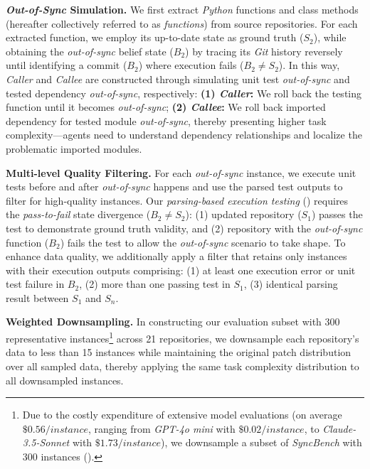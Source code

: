 \textbf{\textit{Out-of-Sync} Simulation.}
We first extract \textit{Python} functions and class methods (hereafter collectively referred to as \textit{functions}) from source repositories.
For each extracted function, we employ its up-to-date state as ground truth ($S_2$), while obtaining the \textit{out-of-sync} belief state ($B_2$) by tracing its \textit{Git} history reversely until identifying a commit ($B_2$) where execution fails ($B_2 \neq S_2$).
% 
In this way, \textit{Caller} and \textit{Callee} are constructed through simulating unit test \textit{out-of-sync} and tested dependency \textit{out-of-sync}, respectively:
\textbf{(1) \textit{Caller}:} We roll back the testing function until it becomes \textit{out-of-sync};
\textbf{(2) \textit{Callee}:} We roll back imported dependency for tested module \textit{out-of-sync}, thereby presenting higher task complexity---agents need to understand dependency relationships and localize the problematic imported modules.

\textbf{Multi-level Quality Filtering.}
For each \textit{out-of-sync} instance, we execute unit tests before and after \textit{out-of-sync} happens and use the parsed test outputs to filter for high-quality instances.
% 
Our \textit{parsing-based execution testing} () requires the \textit{pass-to-fail} state divergence ($B_2 \neq S_2$):
(1) updated repository ($S_1$) passes the test to demonstrate ground truth validity, and (2) repository with the \textit{out-of-sync} function ($B_2$) fails the test to allow the \textit{out-of-sync} scenario to take shape.
To enhance data quality, we additionally apply a filter that retains only instances with their execution outputs comprising: (1) at least one execution error or unit test failure in $B_2$, (2) more than one passing test in $S_1$, (3) identical parsing result between $S_1$ and $S_n$.

\textbf{Weighted Downsampling.}
In constructing our evaluation subset with 300 representative instances\footnote{
\label{Footnote: Cost Constraints}
Due to the costly expenditure of extensive model evaluations (on average $\$0.56/instance$, ranging from \textit{GPT-4o mini} with $\$0.02/instance$, to \textit{Claude-3.5-Sonnet} with $\$1.73/instance$), we downsample a subset of \textit{SyncBench} with 300 instances ().} 
across 21 repositories, we downsample each repository's data to less than 15 instances while maintaining the original patch distribution over all sampled data, thereby applying the same task complexity distribution to all downsampled instances.




